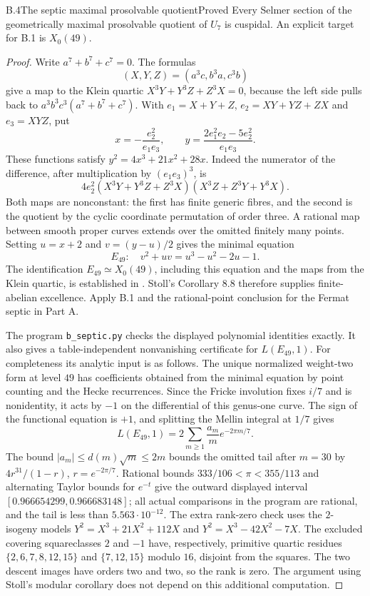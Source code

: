 \begin{statement}{B.4}{The septic maximal prosolvable quotient}{Proved}
Every Selmer section of the geometrically maximal prosolvable quotient
of $U_7$ is cuspidal. An explicit target for B.1 is $X_0(49)$.
\end{statement}
\begin{proof}
Write $a^7+b^7+c^7=0$. The formulas
\[
 (X,Y,Z)=(a^3c,b^3a,c^3b)
\]
give a map to the Klein quartic
$X^3Y+Y^3Z+Z^3X=0$, because the left side pulls back to
$a^3b^3c^3(a^7+b^7+c^7)$. With
$e_1=X+Y+Z$, $e_2=XY+YZ+ZX$ and $e_3=XYZ$, put
\[
 x=-\frac{e_2^2}{e_1e_3},\qquad
 y=\frac{2e_1^2e_2-5e_2^2}{e_1e_3}.
\]
These functions satisfy $y^2=4x^3+21x^2+28x$. Indeed the numerator
of the difference, after multiplication by $(e_1e_3)^3$, is
\[
 4e_2^2(X^3Y+Y^3Z+Z^3X)(X^3Z+Z^3Y+Y^3X).
\]
Both maps are nonconstant: the first has finite generic fibres, and
the second is the quotient by the cyclic coordinate permutation of
order three. A rational map between smooth proper curves extends over
the omitted finitely many points. Setting $u=x+2$ and $v=(y-u)/2$
gives the minimal equation
\[
 E_{49}:\quad v^2+uv=u^3-u^2-2u-1.
\]
The identification $E_{49}\simeq X_0(49)$, including this equation
and the maps from the Klein quartic, is established in
\citet[\S\S2.1, 3.2, 4.2]{BElkies1999}. Stoll's Corollary 8.8
therefore supplies finite-abelian excellence. Apply B.1 and the
rational-point conclusion for the Fermat septic in Part A.

The program \texttt{b\_septic.py} checks the displayed polynomial
identities exactly. It also gives a table-independent nonvanishing
certificate for $L(E_{49},1)$. For completeness its analytic input is
as follows. The unique normalized weight-two form at level $49$ has
coefficients obtained from the minimal equation by point counting and
the Hecke recurrences. Since the Fricke involution fixes $i/7$ and is
nonidentity, it acts by $-1$ on the differential of this genus-one
curve. The sign of the functional equation is $+1$, and splitting the
Mellin integral at $1/7$ gives
\[
 L(E_{49},1)=2\sum_{m\geq1}\frac{a_m}{m}e^{-2\pi m/7}.
\]
The bound $|a_m|\leq d(m)\sqrt m\leq2m$ bounds the omitted tail
after $m=30$ by $4r^{31}/(1-r)$, $r=e^{-2\pi/7}$. Rational bounds
$333/106<\pi<355/113$ and alternating Taylor bounds for $e^{-t}$
give the outward displayed interval
$[0.966654299,0.966683148]$; all actual comparisons in the program
are rational, and the tail is less than $5.563\cdot10^{-12}$.
The extra rank-zero check uses the $2$-isogeny models
$Y^2=X^3+21X^2+112X$ and $Y^2=X^3-42X^2-7X$.
The excluded covering squareclasses $2$ and $-1$ have, respectively,
primitive quartic residues $\{2,6,7,8,12,15\}$ and
$\{7,12,15\}$ modulo $16$, disjoint from the squares.
The two descent images have orders two and two, so the rank is zero.
The argument using Stoll's modular corollary does not depend on this
additional computation.
\end{proof}

